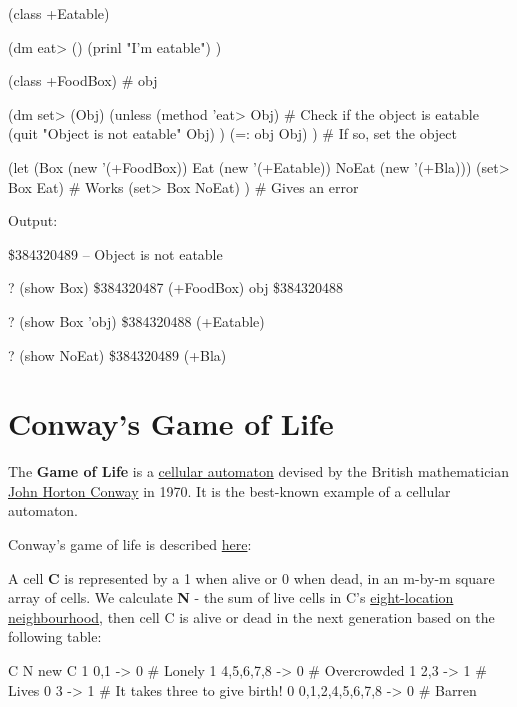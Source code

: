 \begin{wideverbatim}

(class +Eatable)

(dm eat> ()
   (prinl "I'm eatable") )


(class +FoodBox)
# obj

(dm set> (Obj)
   (unless (method 'eat> Obj)                # Check if the object is eatable
      (quit "Object is not eatable" Obj) )
   (=: obj Obj) )                            # If so, set the object


(let (Box (new '(+FoodBox))  Eat (new '(+Eatable))  NoEat (new '(+Bla)))
   (set> Box Eat)       # Works
   (set> Box NoEat) )   # Gives an error

Output:

\$384320489 -- Object is not eatable

? (show Box)
\$384320487 (+FoodBox)
   obj \$384320488

? (show Box 'obj)
\$384320488 (+Eatable)

? (show NoEat)
\$384320489 (+Bla)

\end{wideverbatim}

\pagebreak{}
\section*{Conway's Game of Life}

The \textbf{Game of Life} is a
\href{http://en.wikipedia.org/wiki/cellular\_automaton}{cellular
  automaton} devised by the British mathematician
\href{http://en.wikipedia.org/wiki/John\_Horton\_Conway}{John Horton
  Conway} in 1970. It is the best-known example of a cellular
automaton.

Conway's game of life is described
\href{http://en.wikipedia.org/wiki/Conway\%27s\_Game\_of\_Life}{here}:

A cell \textbf{C} is represented by a 1 when alive or 0 when dead, in an
m-by-m square array of cells. We calculate \textbf{N} - the sum of live
cells in C's
\href{http://en.wikipedia.org/wiki/Moore\_neighborhood}{eight-location
neighbourhood}, then cell C is alive or dead in the next generation
based on the following table:

\begin{wideverbatim}
   C   N                 new C
   1   0,1             ->  0  # Lonely
   1   4,5,6,7,8       ->  0  # Overcrowded
   1   2,3             ->  1  # Lives
   0   3               ->  1  # It takes three to give birth!
   0   0,1,2,4,5,6,7,8 ->  0  # Barren
\end{wideverbatim}

